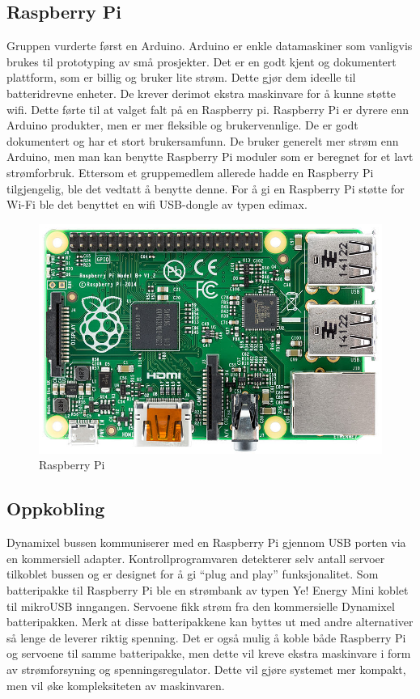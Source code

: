 \documentclass[12pt]{report}
\begin{document}
\subsection{Raspberry Pi}
Gruppen vurderte først en Arduino\cite{Arduino}. Arduino er enkle datamaskiner som vanligvis brukes til prototyping av små prosjekter. Det er en godt kjent og dokumentert plattform, som er billig og bruker lite strøm. Dette gjør dem ideelle til batteridrevne enheter. De krever derimot ekstra maskinvare for å kunne støtte wifi. Dette førte til at valget falt på en Raspberry pi. Raspberry Pi er dyrere enn Arduino produkter, men er mer fleksible og brukervennlige. De er godt dokumentert og har et stort brukersamfunn. De bruker generelt mer strøm enn Arduino, men man kan benytte Raspberry Pi moduler som er beregnet for et lavt strømforbruk\cite{RaspberryApluss}. Ettersom et gruppemedlem allerede hadde en Raspberry Pi tilgjengelig, ble det vedtatt å benytte denne. For å gi en Raspberry Pi støtte for Wi-Fi ble det benyttet en wifi USB-dongle av typen edimax\cite{dongle}.

\begin{figure}[H]
	\includegraphics[scale=0.47]{imgs/RaspberryPi}
	\centering
	\caption{Raspberry Pi}
	\label{Rasp}
\end{figure}

\subsection{Oppkobling}
Dynamixel bussen kommuniserer med en Raspberry Pi gjennom USB porten via en kommersiell adapter\cite{USBadapter}. Kontrollprogramvaren detekterer selv antall servoer tilkoblet bussen og er designet for å gi “plug and play” funksjonalitet. Som batteripakke til Raspberry Pi ble en strømbank av typen Ye! Energy Mini\cite{Energybank} koblet til mikroUSB inngangen. Servoene fikk strøm fra den kommersielle Dynamixel batteripakken. Merk at disse batteripakkene kan byttes ut med andre alternativer så lenge de leverer riktig spenning. Det er også mulig å koble både Raspberry Pi og servoene til samme batteripakke, men dette vil kreve ekstra maskinvare i form av strømforsyning og spenningsregulator. Dette vil gjøre systemet mer kompakt, men vil øke kompleksiteten av maskinvaren.
\end{document}
